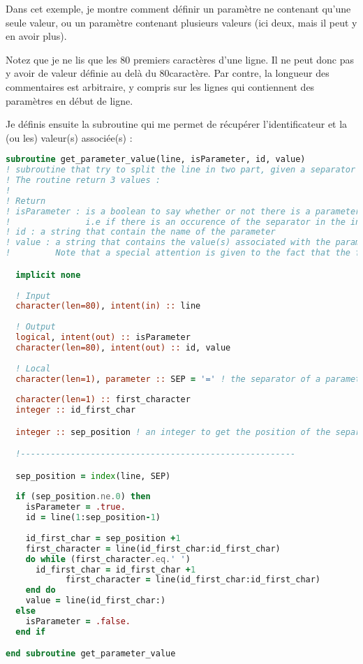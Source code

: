 Dans cet exemple, je montre comment définir un paramètre ne contenant qu'une seule valeur, ou un paramètre contenant plusieurs valeurs (ici deux, mais il peut y en avoir plus). 

\begin{attention}
Notez que je ne lis que les 80 premiers caractères d'une ligne. Il ne peut donc pas y avoir de valeur définie au delà du 80\ieme caractère. Par contre, la longueur des commentaires est arbitraire, y compris sur les lignes qui contiennent des paramètres en début de ligne.
\end{attention}


Je définis ensuite la subroutine qui me permet de récupérer l'identificateur et la (ou les) valeur(s) associée(s) : 
\begin{lstlisting}[language=Fortran]
subroutine get_parameter_value(line, isParameter, id, value)
! subroutine that try to split the line in two part, given a separator value (set in parameter of the subroutine)
! The routine return 3 values : 
!
! Return
! isParameter : is a boolean to say whether or not there is a parameter on this line. 
!               i.e if there is an occurence of the separator in the input line
! id : a string that contain the name of the parameter
! value : a string that contains the value(s) associated with the parameter name. 
!         Note that a special attention is given to the fact that the first character of 'value' must NOT be a 'space'

  implicit none
  
  ! Input
  character(len=80), intent(in) :: line
  
  ! Output
  logical, intent(out) :: isParameter
  character(len=80), intent(out) :: id, value
  
  ! Local
  character(len=1), parameter :: SEP = '=' ! the separator of a parameter line
  
  character(len=1) :: first_character
  integer :: id_first_char

  integer :: sep_position ! an integer to get the position of the separator

  !-------------------------------------------------------

  sep_position = index(line, SEP)
  
  if (sep_position.ne.0) then
    isParameter = .true.
    id = line(1:sep_position-1)
    
    id_first_char = sep_position +1
    first_character = line(id_first_char:id_first_char)
    do while (first_character.eq.' ')
      id_first_char = id_first_char +1
			first_character = line(id_first_char:id_first_char)
    end do
    value = line(id_first_char:)
  else
    isParameter = .false.
  end if

end subroutine get_parameter_value
\end{lstlisting}

